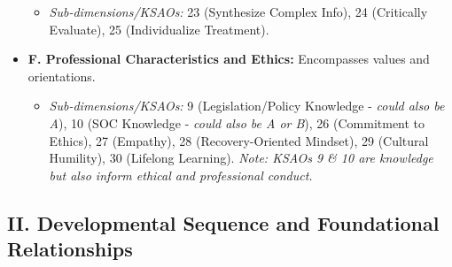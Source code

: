 \documentclass[
  letterpaper,
  DIV=11,
  numbers=noendperiod]{scrartcl}
\providecommand{\tightlist}{%
  \setlength{\itemsep}{0pt}\setlength{\parskip}{0pt}}
\begin{document}
\begin{itemize}
  \begin{itemize}
  \tightlist
  \item
    \emph{Sub-dimensions/KSAOs:} 23 (Synthesize Complex Info), 24
    (Critically Evaluate), 25 (Individualize Treatment).
  \end{itemize}
\item
  \textbf{F. Professional Characteristics and Ethics:} Encompasses
  values and orientations.

  \begin{itemize}
  \tightlist
  \item
    \emph{Sub-dimensions/KSAOs:} 9 (Legislation/Policy Knowledge -
    \emph{could also be A}), 10 (SOC Knowledge - \emph{could also be A
    or B}), 26 (Commitment to Ethics), 27 (Empathy), 28
    (Recovery-Oriented Mindset), 29 (Cultural Humility), 30 (Lifelong
    Learning). \emph{Note: KSAOs 9 \& 10 are knowledge but also inform
    ethical and professional conduct.}
  \end{itemize}
\end{itemize}

\subsection{II. Developmental Sequence and Foundational
Relationships}\label{ii.-developmental-sequence-and-foundational-relationships}
\end{document}
